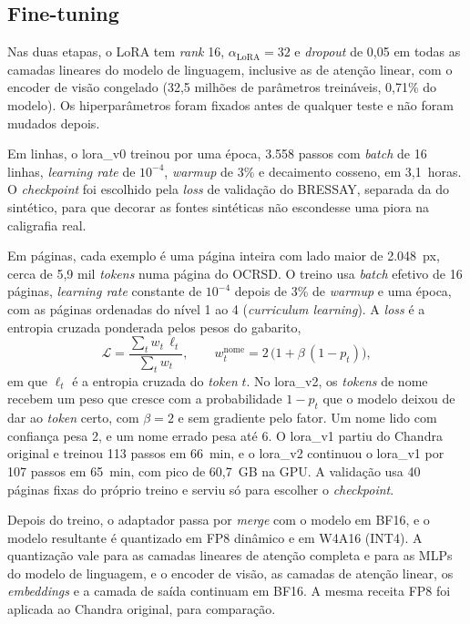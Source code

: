 \subsection{Fine-tuning}
\label{subsec:ajuste}

Nas duas etapas, o LoRA tem \emph{rank} 16, $\alpha_{\text{LoRA}} = 32$ e \emph{dropout} de 0,05 em todas as camadas lineares do modelo de linguagem, inclusive as de atenção linear, com o encoder de visão congelado (32,5 milhões de parâmetros treináveis, 0,71\% do modelo). Os hiperparâmetros foram fixados antes de qualquer teste e não foram mudados depois.

Em linhas, o lora\_v0 treinou por uma época, 3.558 passos com \emph{batch} de 16 linhas, \emph{learning rate} de $10^{-4}$, \emph{warmup} de 3\% e decaimento cosseno, em 3,1~horas. O \emph{checkpoint} foi escolhido pela \emph{loss} de validação do BRESSAY, separada da do sintético, para que decorar as fontes sintéticas não escondesse uma piora na caligrafia real.

Em páginas, cada exemplo é uma página inteira com lado maior de 2.048~px, cerca de 5,9 mil \emph{tokens} numa página do OCRSD. O treino usa \emph{batch} efetivo de 16 páginas, \emph{learning rate} constante de $10^{-4}$ depois de 3\% de \emph{warmup} e uma época, com as páginas ordenadas do nível 1 ao 4 (\emph{curriculum learning}). A \emph{loss} é a entropia cruzada ponderada pelos pesos do gabarito,
\[
\mathcal{L} = \frac{\sum_t w_t\, \ell_t}{\sum_t w_t}, \qquad
w_t^{\text{nome}} = 2\,\bigl(1 + \beta\,(1 - p_t)\bigr),
\]
em que $\ell_t$ é a entropia cruzada do \emph{token} $t$. No lora\_v2, os \emph{tokens} de nome recebem um peso que cresce com a probabilidade $1 - p_t$ que o modelo deixou de dar ao \emph{token} certo, com $\beta = 2$ e sem gradiente pelo fator. Um nome lido com confiança pesa 2, e um nome errado pesa até 6. O lora\_v1 partiu do Chandra original e treinou 113 passos em 66~min, e o lora\_v2 continuou o lora\_v1 por 107 passos em 65~min, com pico de 60,7~GB na GPU. A validação usa 40 páginas fixas do próprio treino e serviu só para escolher o \emph{checkpoint}.

Depois do treino, o adaptador passa por \emph{merge} com o modelo em BF16, e o modelo resultante é quantizado em FP8 dinâmico e em W4A16 (INT4). A quantização vale para as camadas lineares de atenção completa e para as MLPs do modelo de linguagem, e o encoder de visão, as camadas de atenção linear, os \emph{embeddings} e a camada de saída continuam em BF16. A mesma receita FP8 foi aplicada ao Chandra original, para comparação.

